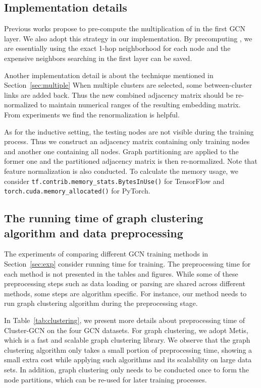 \documentclass[sigconf]{acmart}
\begin{document}
\subsection{Implementation details}
Previous works \citep{chen2018fastgcn, chen2018stochastic} propose to pre-compute the multiplication of  in the first GCN layer.
We also adopt this strategy in our implementation.
By precomputing , we are essentially using the exact 1-hop neighborhood for each node and the expensive neighbors searching in the first layer can be saved.

Another implementation detail is about the technique mentioned in Section~\ref{sec:multiple}
When multiple clusters are selected, some between-cluster links are added back.
Thus the new combined adjacency matrix should be re-normalized to maintain numerical ranges of the resulting embedding matrix.
From experiments we find the renormalization is helpful.

As for the inductive setting, the testing nodes are not visible during the training process.
Thus we construct an adjacency matrix containing only training nodes and another one containing all nodes.
Graph partitioning are applied to the former one and the partitioned adjacency matrix is then re-normalized.
Note that feature normalization is also conducted.
To calculate the memory usage, we consider \texttt{tf.contrib.memory\_stats.BytesInUse()}  for TensorFlow and \texttt{torch.cuda.memory\_allocated()} for PyTorch.

\subsection{The running time of graph clustering algorithm and data preprocessing}

The experiments of comparing different GCN training methods in Section~\ref{sec:exp} consider running time for training.
The preprocessing time for each method is not presented in the tables and figures.
While some of these preprocessing steps such as data loading or parsing are shared across different methods, some steps are algorithm specific.
For instance, our method needs to run graph clustering algorithm during the preprocessing stage.


In Table~\ref{tab:clustering}, we present more details about preprocessing time of Cluster-GCN on the four GCN datasets. For graph clustering, we adopt Metis, which is a fast and scalable graph clustering library.
We observe that the graph clustering algorithm only takes a small portion of preprocessing time, showing a small extra cost while applying such algorithms and its scalability on large data sets.
In addition, graph clustering only needs to be conducted once to form the node partitions, which can be re-used for later training processes.
\end{document}
